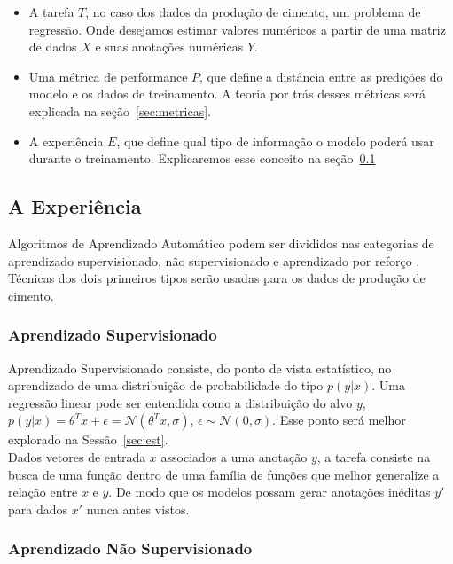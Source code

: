 \begin{itemize}

  
\item A tarefa $T$, no caso dos dados da produção de cimento, um problema de regressão.
  Onde desejamos estimar valores numéricos a partir de uma matriz de dados $X$ e
  suas anotações numéricas $Y$. 
  
\item Uma métrica de performance $P$, que define a distância entre as predições
  do modelo e os dados de treinamento. A teoria por trás desses métricas será explicada na seção~\ref{sec:metricas}.

\item A experiência $E$, que define qual tipo de informação o modelo poderá usar
  durante o treinamento. Explicaremos esse conceito na seção~\ref{sec:exp} 
  
\end{itemize}

\subsection{A Experiência}
\label{sec:exp}
Algoritmos de Aprendizado Automático podem ser divididos nas categorias de
aprendizado supervisionado, não supervisionado e aprendizado por reforço
\citep{dlbook}. Técnicas dos dois primeiros tipos serão usadas para os dados de
produção de cimento.


\subsubsection{Aprendizado Supervisionado}
\label{sec:apren} 
Aprendizado Supervisionado consiste, do ponto de vista estatístico, no
aprendizado de uma distribuição de probabilidade do tipo $p(y | x)$. Uma
regressão linear pode ser entendida como a distribuição do alvo $y$, $p(y | x) = \theta^Tx + \epsilon =
\mathcal{N}(\theta^Tx,\sigma) $, $\epsilon \sim \mathcal{N}(0,\sigma)$. Esse ponto será melhor
explorado na Sessão~\ref{sec:est}. \\ 

Dados vetores de entrada $x$ associados a uma anotação $y$, a tarefa consiste na busca de uma
função dentro de uma família de funções que melhor generalize a relação entre
$x$ e $y$. De modo que os modelos possam gerar anotações inéditas $y'$ para
dados $x'$ nunca antes vistos. 


\subsubsection{Aprendizado Não Supervisionado}

